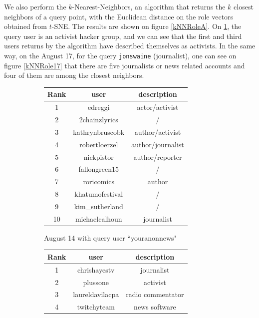 \documentclass[a4paper,twoside,12pt,openright]{report}
\begin{document}
We also perform the $k$-Nearest-Neighbors, an algorithm that returns the $k$ closest neighbors of a query point, with the Euclidean distance on the role vectors obtained from $t$-SNE. The results are shown on figure \ref{kNNRoleA}. On \ref{kNNRole14}, the query user is an activist hacker group, and we can see that the first and third users returns by the algorithm have described themselves as activists. In the same way, on the August 17, for the query \texttt{jonswaine} (journalist), one can see on figure \ref{kNNRole17} that there are five journalists or news related accounts and four of them are among the closest neighbors.

\vspace*{1cm}

\begin{figure}[H]
\begin{subfigure}[t]{0.5\textwidth}
\footnotesize
  \centering
\begin{tabular}{ccc}
\hline
Rank & \textbf{user} & \textbf{description} \\ \hline \hline
1 & edreggi & actor/activist \\ \hline
2 & 2chainzlyrics & / \\ \hline
3 & kathrynbruscobk & author/activist \\ \hline
4 & robertloerzel & author/journalist \\ \hline
5 & nickpistor & author/reporter \\ \hline
6 & fallongreen15 & / \\ \hline
7 & roricomics & author \\ \hline
8 & khatumofestival & / \\ \hline
9 & kim\_sutherland & / \\ \hline
10 & michaelcalhoun & journalist \\ \hline
\hline
\end{tabular}
\caption{August 14 with query user ``youranonnews"}
\label{kNNRole14}
\end{subfigure}
\hfill
\begin{subfigure}[t]{0.5\textwidth}
  \centering
  \footnotesize
\begin{tabular}{ccc}
\hline
Rank & \textbf{user} & \textbf{description} \\ \hline \hline
1 & chrishayestv & journalist \\ \hline
2 & plussone & activist \\ \hline
3 & laureldavilacpa & radio commentator \\ \hline
4 & twitchyteam & news software \\ \hline

\end{tabular}
\end{subfigure}
\end{figure}
\end{document}
